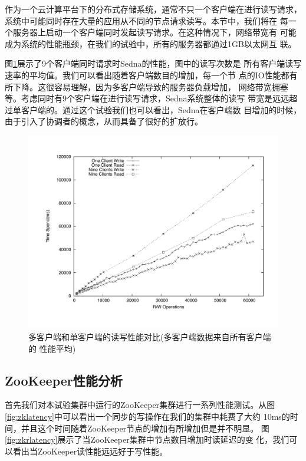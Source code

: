 作为一个云计算平台下的分布式存储系统，通常不只一个客户端在进行读写请求，
系统中可能同时存在大量的应用从不同的节点请求读写。本节中，我们将在
每一个服务器上启动一个客户端同时发起读写请求。在这种情况下，网络带宽有
可能成为系统的性能瓶颈，在我们的试验中，所有的服务器都通过1GB以太网互
联。

图\ref{fig:perf}展示了9个客户端同时请求时Sedna的性能，图中的读写次数是
所有客户端读写速率的平均值。我们可以看出随着客户端数目的增加，每一个节
点的IO性能都有所下降。这很容易理解，因为多客户端导致的服务器负载增加，
网络带宽拥塞等。考虑同时有9个客户端在进行读写请求，Sedna系统整体的读写
带宽是远远超过单客户端的。通过这个试验我们也可以看出，Sedna在客户端数
目增加的时候，由于引入了协调者的概念，从而具备了很好的扩放行。

\begin{figure}[h!]
\centering
\includegraphics[width=5in]{../figures/sedna_one_client_nine_clients_compare.pdf}
\caption{多客户端和单客户端的读写性能对比(多客户端数据来自所有客户端的
  性能平均)}
\label{fig:perf}
\end{figure}

\subsection{ZooKeeper性能分析}

首先我们对本试验集群中运行的ZooKeeper集群进行一系列性能测试。从图
\ref{fig:zklatency}中可以看出一个同步的写操作在我们的集群中耗费了大约
10ms的时间，并且这个时间随着ZooKeeper节点的增加有所增加但是并不明显。
图\ref{fig:zkrlatency}展示了当ZooKeeper集群中节点数目增加时读延迟的变
化，我们可以看出当ZooKeeper读性能远远好于写性能。

